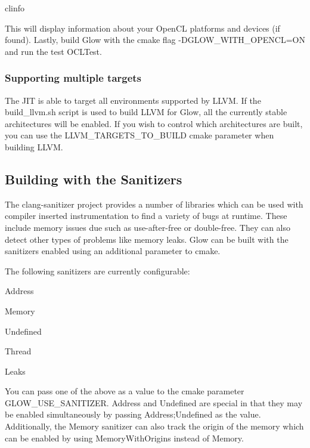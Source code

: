 \begin{DoxyCode}
clinfo
\end{DoxyCode}


This will display information about your Open\+CL platforms and devices (if found). Lastly, build Glow with the cmake flag {\ttfamily -\/\+D\+G\+L\+O\+W\+\_\+\+W\+I\+T\+H\+\_\+\+O\+P\+E\+N\+CL=ON} and run the test {\ttfamily O\+C\+L\+Test}.

\subsubsection*{Supporting multiple targets}

The J\+IT is able to target all environments supported by L\+L\+VM. If the {\ttfamily build\+\_\+llvm.\+sh} script is used to build L\+L\+VM for Glow, all the currently stable architectures will be enabled. If you wish to control which architectures are built, you can use the {\ttfamily L\+L\+V\+M\+\_\+\+T\+A\+R\+G\+E\+T\+S\+\_\+\+T\+O\+\_\+\+B\+U\+I\+LD} cmake parameter when building L\+L\+VM.

\subsection*{Building with the Sanitizers}

The clang-\/sanitizer project provides a number of libraries which can be used with compiler inserted instrumentation to find a variety of bugs at runtime. These include memory issues due such as use-\/after-\/free or double-\/free. They can also detect other types of problems like memory leaks. Glow can be built with the sanitizers enabled using an additional parameter to cmake.

The following sanitizers are currently configurable\+:


\begin{DoxyItemize}
\item Address
\item Memory
\item Undefined
\item Thread
\item Leaks
\end{DoxyItemize}

You can pass one of the above as a value to the cmake parameter {\ttfamily G\+L\+O\+W\+\_\+\+U\+S\+E\+\_\+\+S\+A\+N\+I\+T\+I\+Z\+ER}. {\ttfamily Address} and {\ttfamily Undefined} are special in that they may be enabled simultaneously by passing {\ttfamily Address;Undefined} as the value. Additionally, the {\ttfamily Memory} sanitizer can also track the origin of the memory which can be enabled by using {\ttfamily Memory\+With\+Origins} instead of {\ttfamily Memory}.

